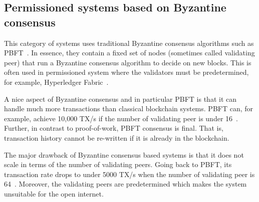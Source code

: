 

\subsection{Permissioned systems based on Byzantine consensus}

This category of systems uses traditional Byzantine consensus algorithms such as PBFT~\cite{castro1999practical}.
In essence, they contain a fixed set of nodes (sometimes called validating peer) that run a Byzantine consensus algorithm to decide on new blocks.
This is often used in permissioned system where the validators must be predetermined,
for example, Hyperledger Fabric~\cite{cachin2016architecture}.

A nice aspect of Byzantine consensus and in particular PBFT is that it can handle much more transactions than classical blockchain systems.
PBFT can, for example, achieve 10,000 TX/s if the number of validating peer is under 16~\cite[Section 5.2]{miller2016honey}.
Further, in contrast to proof-of-work, PBFT consensus is final.
That is, transaction history cannot be re-written if it is already in the blockchain.

The major drawback of Byzantine consensus based systems is that it does not scale in terms of the number of validating peers.
Going back to PBFT, its transaction rate drops to under 5000 TX/s when the number of validating peer is 64~\cite[Section 5.2]{miller2016honey}.
Moreover, the validating peers are predetermined which makes the system unsuitable for the open internet.


